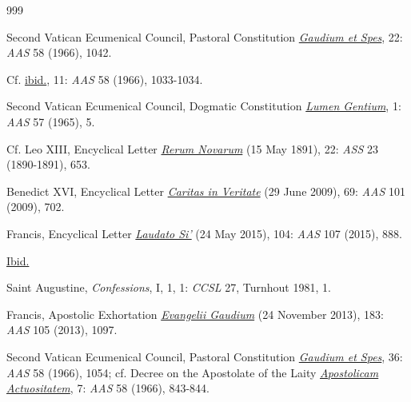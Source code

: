 \documentclass{article}
\begin{document}
\clearpage
\begin{thebibliography}{999}

 Second Vatican Ecumenical Council, Pastoral Constitution \href{https://www.vatican.va/archive/hist_councils/ii_vatican_council/documents/vat-ii_const_19651207_gaudium-et-spes_en.html}{\emph{Gaudium et Spes}}, 22: \emph{AAS} 58 (1966), 1042.

 Cf. \href{https://www.vatican.va/archive/hist_councils/ii_vatican_council/documents/vat-ii_const_19651207_gaudium-et-spes_en.html}{ibid.}, 11: \emph{AAS} 58 (1966), 1033-1034.

 Second Vatican Ecumenical Council, Dogmatic Constitution \href{https://www.vatican.va/archive/hist_councils/ii_vatican_council/documents/vat-ii_const_19641121_lumen-gentium_en.html}{\emph{Lumen Gentium}}, 1: \emph{AAS} 57 (1965), 5.

 Cf. Leo XIII, Encyclical Letter \href{https://www.vatican.va/content/leo-xiii/en/encyclicals/documents/hf_l-xiii_enc_15051891_rerum-novarum.html}{\emph{Rerum Novarum}} (15 May 1891), 22: \emph{ASS} 23 (1890-1891), 653.

 Benedict XVI, Encyclical Letter \href{https://www.vatican.va/content/benedict-xvi/en/encyclicals/documents/hf_ben-xvi_enc_20090629_caritas-in-veritate.html}{\emph{Caritas in Veritate}} (29 June 2009), 69: \emph{AAS} 101 (2009), 702.

 Francis, Encyclical Letter \href{https://www.vatican.va/content/francesco/en/encyclicals/documents/papa-francesco_20150524_enciclica-laudato-si.html}{\emph{Laudato Si'}} (24 May 2015), 104: \emph{AAS} 107 (2015), 888.

 \href{https://www.vatican.va/content/francesco/en/encyclicals/documents/papa-francesco_20150524_enciclica-laudato-si.html}{Ibid.}

 Saint Augustine, \emph{Confessions}, I, 1, 1: \emph{CCSL} 27, Turnhout 1981, 1.

 Francis, Apostolic Exhortation \href{https://www.vatican.va/content/francesco/en/apost_exhortations/documents/papa-francesco_esortazione-ap_20131124_evangelii-gaudium.html}{\emph{Evangelii Gaudium}} (24 November 2013), 183: \emph{AAS} 105 (2013), 1097.

 Second Vatican Ecumenical Council, Pastoral Constitution \href{https://www.vatican.va/archive/hist_councils/ii_vatican_council/documents/vat-ii_const_19651207_gaudium-et-spes_en.html}{\emph{Gaudium et Spes}}, 36: \emph{AAS} 58 (1966), 1054; cf. Decree on the Apostolate of the Laity \href{https://www.vatican.va/archive/hist_councils/ii_vatican_council/documents/vat-ii_decree_19651118_apostolicam-actuositatem_en.html}{\emph{Apostolicam Actuositatem}}, 7: \emph{AAS} 58 (1966), 843-844.


\end{thebibliography}
\end{document}
